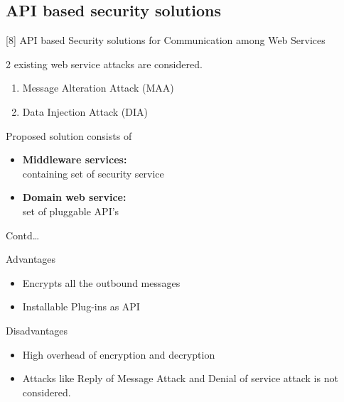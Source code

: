 \documentclass[10pt]{beamer}
\begin{document}
\subsection{API based security solutions}
\begin{frame}{[8] API based Security solutions for
Communication among Web Services}
\begin{block}{}
2 existing web service attacks are considered.
\begin{enumerate}
\item Message Alteration Attack (MAA)
\item Data Injection Attack (DIA)
\end{enumerate}
Proposed solution consists of
\begin{itemize}
\item \textbf{Middleware services:}\\
containing set of security service
\item \textbf{Domain web service:}\\
set of pluggable API's
\end{itemize} 

\end{block}

\end{frame}
\begin{frame}{Contd\dots}
\begin{block}{Advantages}
\begin{itemize}
\item Encrypts all the outbound messages
\item Installable Plug-ins as API
\end{itemize}
\end{block}
\begin{block}{Disadvantages}
\begin{itemize}

\item High overhead of encryption and decryption
\item Attacks like Reply of Message Attack and Denial of service attack is not considered.

\end{itemize}
\end{block}
\end{frame}
\end{document}
